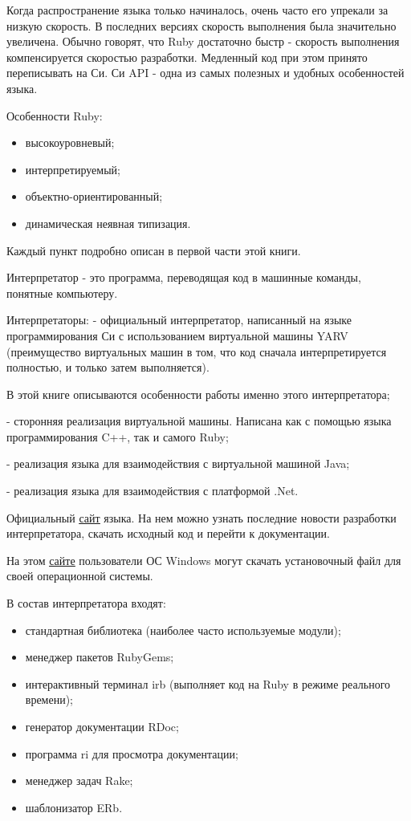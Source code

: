 \begin{note}
  Когда распространение языка только начиналось, очень часто его упрекали за низкую скорость. В последних версиях скорость выполнения была значительно увеличена. Обычно говорят, что Ruby достаточно быстр - скорость выполнения компенсируется скоростью разработки. Медленный код при этом принято переписывать на Си. Си API - одна из самых полезных и удобных особенностей языка.
\end{note}

Особенности Ruby:
\begin{itemize}
  \item высокоуровневый;
  \item интерпретируемый;
  \item объектно-ориентированный;
  \item динамическая неявная типизация.
\end{itemize}

Каждый пункт подробно описан в первой части этой книги.

Интерпретатор - это программа, переводящая код в машинные команды, понятные компьютеру.

\begin{keylist}{Интерпретаторы:}  
   - официальный интерпретатор, написанный на языке программирования Си с использованием виртуальной машины YARV (преимущество виртуальных машин в том, что код сначала интерпретируется полностью, и только затем выполняется).

  В этой книге описываются особенности работы именно этого интерпретатора;
  
   - сторонняя реализация виртуальной машины. Написана как с помощью языка программирования C++, так и самого Ruby;
  
   - реализация языка для взаимодействия с виртуальной машиной Java;
  
   - реализация языка для взаимодействия с платформой .Net.
\end{keylist}

Официальный \href{http://www.ruby-lang.org}{\underline{сайт}} языка. На нем можно узнать последние новости разработки интерпретатора, скачать исходный код и перейти к документации.

На этом \href{http://rubyinstaller.org}{\underline{сайте}} пользователи ОС Windows могут скачать установочный файл для своей операционной системы. 

В состав интерпретатора входят:
\begin{itemize}
  \item стандартная библиотека (наиболее часто используемые модули); 
  \item менеджер пакетов RubyGems; 
  \item интерактивный терминал irb (выполняет код на Ruby в режиме реального времени); 
  \item генератор документации RDoc; 
  \item программа ri для просмотра документации; 
  \item менеджер задач Rake; 
  \item шаблонизатор ERb.
\end{itemize} 

